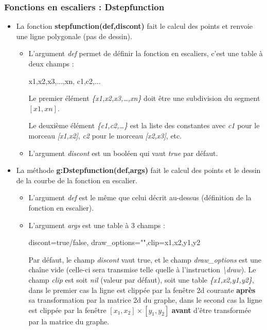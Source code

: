 \subsubsection{Fonctions en escaliers : Dstepfunction}

\begin{itemize}
\item La fonction \textbf{stepfunction(def,discont)} fait le calcul des points et renvoie une ligne polygonale (pas de dessin).

  \begin{itemize}
  \item  L'argument \emph{def} permet de définir la fonction en escaliers, c'est une table à deux champs :

\begin{TeXcode}
  { {x1,x2,x3,...,xn}, {c1,c2,...} }
\end{TeXcode}

  Le premier élément \emph{\{x1,x2,x3,\ldots,xn\}} doit être une subdivision du segment \([x1,xn]\).
  
  Le deuxième élément \emph{\{c1,c2,\ldots\}} est la liste des constantes avec \emph{c1} pour le morceau \emph{{[}x1,x2{]}}, \emph{c2} pour le morceau \emph{{[}x2,x3{]}}, etc.
  
  \item   L'argument \emph{discont} est un booléen qui vaut \emph{true} par défaut.
  \end{itemize}
  
\item La méthode \textbf{g:Dstepfunction(def,args)} fait le calcul des points et le dessin de la courbe de la fonction en escalier.

  \begin{itemize}
  \item L'argument \emph{def} est le même que celui décrit au-dessus (définition de la fonction en escalier).
  \item L'argument \emph{args} est une table à 3 champs : 
  
\begin{TeXcode}
  { discont=true/false, draw_options="",clip={x1,x2,y1,y2} }
\end{TeXcode}

  Par défaut, le champ \emph{discont} vaut true, et le champ \emph{draw\_options} est une chaîne vide (celle-ci sera transmise telle quelle à l'instruction \emph{\textbackslash draw}). Le champ \emph{clip} est soit \emph{nil} (valeur par défaut), soit une table \emph{\{x1,x2,y1,y2\}}, dans le premier cas la ligne est clippée par la fenêtre 2d courante \textbf{après} sa transformation par la matrice 2d du graphe, dans le second cas la ligne est clippée par la fenêtre $[x_1,x_2]\times[y_1,y_2]$ \textbf{avant} d'être transformée par la matrice du graphe.

  \end{itemize}
\end{itemize}

